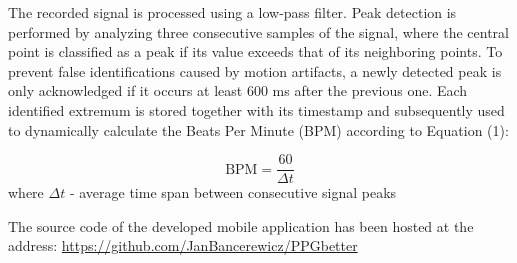 \documentclass[journal]{IEEEtran}
\begin{document}

\newpage
The recorded signal is processed using a low-pass filter. Peak detection is performed by analyzing three consecutive samples of the signal, where the central point is classified as a peak if its value exceeds that of its neighboring points. To prevent false identifications caused by motion artifacts, a newly detected peak is only acknowledged if it occurs at least 600 ms after the previous one. Each identified extremum is stored together with its timestamp and subsequently used to dynamically calculate the Beats Per Minute (BPM) according to Equation (1):

\begin{equation}
\text{BPM} = \frac{60}{\Delta t}
\label{eq:bpm}
\end{equation}
where $\Delta t$  - average time span between consecutive signal peaks

The source code of the developed mobile application has been hosted at the address:
\href{https://github.com/JanBancerewicz/PPGbetter}{https://github.com/JanBancerewicz/PPGbetter}

\newpage
\end{document}
